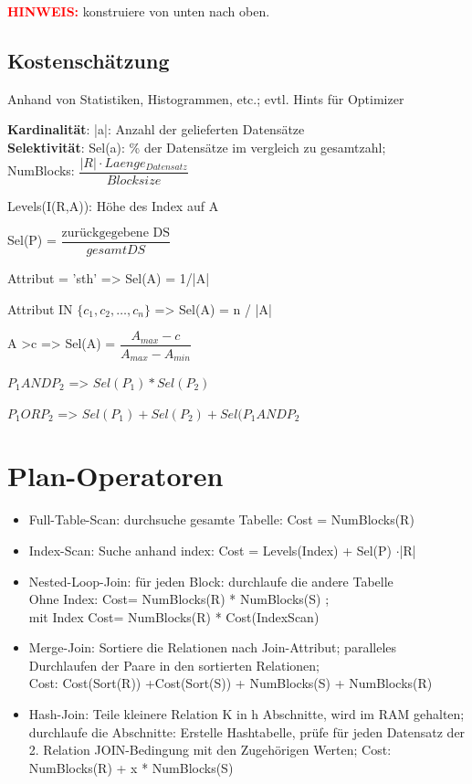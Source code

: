 \textbf{\textcolor{red}{HINWEIS:}} konstruiere von unten nach oben.

\subsection*{Kostenschätzung}
Anhand von Statistiken, Histogrammen, etc.; evtl. Hints für Optimizer

\textbf{Kardinalität}: |a|: Anzahl der gelieferten Datensätze \\
\textbf{Selektivität}: Sel(a): \% der Datensätze im vergleich zu gesamtzahl;\\
NumBlocks: $\dfrac{|R|\cdot Laenge_{Datensatz}}{Blocksize}$

Levels(I(R,A)): Höhe des Index auf A

Sel(P) = $\dfrac{\text{zurückgegebene DS}}{gesamt DS}$

Attribut = 'sth' => Sel(A) = 1/|A|

Attribut IN $\{c_1,c_2, \dots , c_n\}$ => Sel(A) = n / |A|

A >c => Sel(A) = $\dfrac{A_{max} -c }{A_{max} - A_{min}}$

$P_1 AND P_2$ => $Sel(P_1)*Sel(P_2)$

$P_1 OR P_2$ => $Sel(P_1) + Sel(P_2) + Sel(P_1 AND P_2$

\section*{Plan-Operatoren}
\begin{itemize}
\item Full-Table-Scan: durchsuche gesamte Tabelle: Cost = NumBlocks(R)
\item Index-Scan: Suche anhand index: Cost = Levels(Index) + Sel(P) $\cdot$|R|
\item Nested-Loop-Join: für jeden Block: durchlaufe die andere Tabelle\\
Ohne Index: Cost= NumBlocks(R) * NumBlocks(S) ; \\
mit Index Cost= NumBlocks(R) * Cost(IndexScan)
\item Merge-Join: Sortiere die Relationen nach Join-Attribut; paralleles Durchlaufen der Paare in den sortierten Relationen;\\
Cost: Cost(Sort(R)) +Cost(Sort(S)) + NumBlocks(S) + NumBlocks(R)
\item Hash-Join: Teile kleinere Relation K in h Abschnitte, wird im RAM gehalten;\\
durchlaufe die Abschnitte: Erstelle Hashtabelle, prüfe für jeden Datensatz der 2. Relation JOIN-Bedingung mit den Zugehörigen Werten; Cost: NumBlocks(R) + x * NumBlocks(S)

\end{itemize}